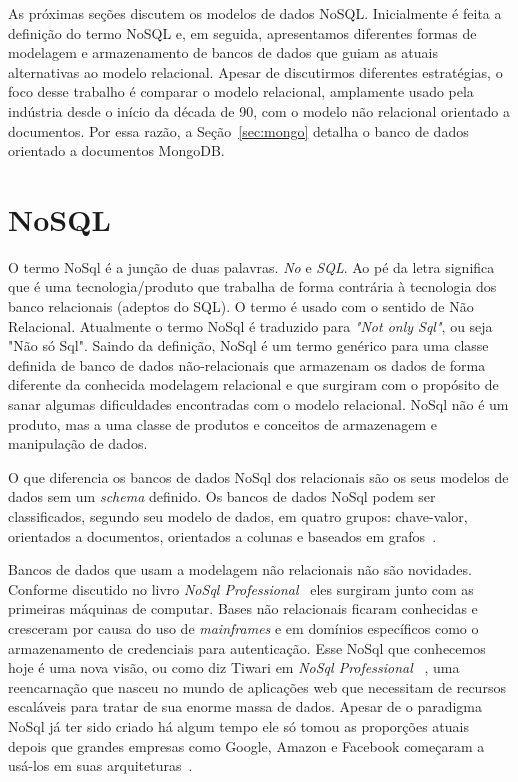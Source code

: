 
As próximas seções discutem os modelos de dados NoSQL. Inicialmente é
feita a definição do termo NoSQL e, em seguida,
apresentamos diferentes formas de modelagem e armazenamento de bancos de
dados que guiam as atuais alternativas ao modelo relacional. Apesar de
discutirmos diferentes estratégias, o foco desse trabalho é comparar o
modelo relacional, amplamente usado pela indústria desde o início da
década de 90, com o modelo não relacional orientado a documentos. Por
essa razão, a Seção~\ref{sec:mongo} detalha o banco de dados orientado
a documentos MongoDB. 


\section{NoSQL}

O termo NoSql é a junção de duas palavras. \textit{No} e \textit{SQL}. Ao pé da letra significa que é uma tecnologia/produto que trabalha de forma contrária à tecnologia dos banco relacionais (adeptos do SQL). O termo é usado com o sentido de Não Relacional. Atualmente o termo NoSql é traduzido para \textit{"Not only Sql"}, ou seja "Não só Sql".
Saindo da definição, NoSql é um termo genérico para uma classe definida de banco de dados não-relacionais que armazenam os dados  de forma diferente da conhecida modelagem relacional e que surgiram com o propósito de sanar algumas dificuldades encontradas com o modelo relacional. NoSql não é um produto, mas a uma classe de produtos e conceitos de armazenagem e manipulação de dados. 

O que diferencia os bancos de dados NoSql dos relacionais são os seus modelos de dados sem um \textit{schema} definido. Os bancos de dados NoSql podem ser classificados, segundo seu modelo de dados, em quatro grupos: chave-valor, orientados a documentos, orientados a colunas e baseados em grafos~\cite{nosqlxrelacional,nosqlevaluation}.

Bancos de dados que usam a modelagem não relacionais não são novidades. Conforme discutido no livro \emph{NoSql Professional}~\cite{nosqlprofessional} eles surgiram junto com as primeiras máquinas de computar. Bases não relacionais ficaram conhecidas e cresceram por causa do uso de \textit{mainframes} e em domínios específicos como o armazenamento de credenciais para autenticação. Esse NoSql que conhecemos hoje é uma nova visão, ou como diz Tiwari em \emph{NoSql Professional} ~\cite{nosqlprofessional}, uma reencarnação que nasceu no mundo de aplicações web que necessitam de recursos escaláveis para tratar de sua enorme massa de dados. Apesar de o paradigma NoSql já ter sido criado há algum tempo ele só tomou as proporções atuais depois que grandes empresas como Google, Amazon e Facebook começaram a usá-los em suas arquiteturas~\cite{nosqlevaluation}.

